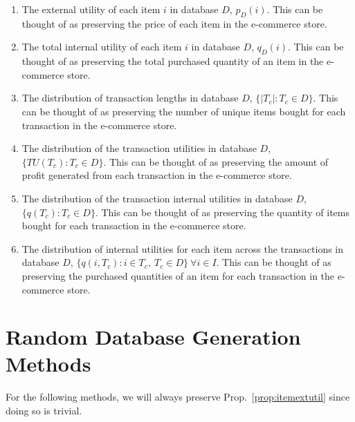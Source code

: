 \documentclass{article}
\begin{document}
\begin{enumerate}
    \item\label{prop:itemextutil} The external utility of each item $i$
        in database $D$, $p_D(i)$. This can be thought of as preserving the
        price of each item in the e-commerce store.
    \item\label{prop:itemtotintutil} The total internal utility of each item
        $i$ in database $D$, $q_D(i)$. This can be thought of as preserving the
        total purchased quantity of an item in the e-commerce store.
    \item\label{prop:disttranslen} The distribution of transaction lengths in
        database $D$, $\{|T_c| : T_c \in D\}$. This can be thought of as
        preserving the number of unique items bought for each transaction in
        the e-commerce store.
    \item\label{prop:disttransutil} The distribution of the transaction
        utilities in database $D$, $\{TU(T_c) : T_c \in D\}$. This can be
        thought of as preserving the amount of profit generated from each
        transaction in the e-commerce store.
    \item\label{prop:disttransintutil} The distribution of the transaction
        internal utilities in database $D$, $\{q(T_c) : T_c \in D\}$. This can
        be thought of as preserving the quantity of items bought for each
        transaction in the e-commerce store.
    \item\label{prop:distitemintutil} The distribution of internal utilities
        for each item across the transactions in database $D$, $\{q(i, T_c) : i
        \in T_c, \ T_c \in D\} \ \forall i \in I$. This can be thought of
        as preserving the purchased quantities of an item for each transaction
        in the e-commerce store.
\end{enumerate}

\section{Random Database Generation Methods}

For the following methods, we will always preserve Prop.~\ref{prop:itemextutil}
since doing so is trivial.
\end{document}
